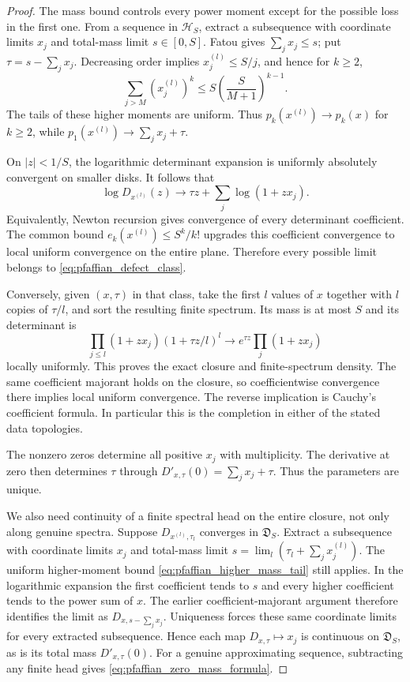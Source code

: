 \documentclass[11pt,a4paper]{amsart}
\numberwithin{equation}{section}
\theoremstyle{definition}
\theoremstyle{remark}
\begin{document}
\begin{proof}
The mass bound controls every power moment except for the possible loss in the first one. From a sequence in $\mathcal H_S$, extract a subsequence with coordinate limits $x_j$ and total-mass limit $s\in[0,S]$. Fatou gives $\sum_jx_j\le s$; put $\tau=s-\sum_jx_j$. Decreasing order implies $x_j^{(l)}\le S/j$, and hence for $k\ge2$,
\begin{equation}\label{eq:pfaffian_higher_mass_tail}
 \sum_{j>M}(x_j^{(l)})^k
 \le S\left(\frac{S}{M+1}\right)^{k-1}.
\end{equation}
The tails of these higher moments are uniform. Thus $p_k(x^{(l)})\to p_k(x)$ for $k\ge2$, while $p_1(x^{(l)})\to\sum_jx_j+\tau$.

On $|z|<1/S$, the logarithmic determinant expansion is uniformly absolutely convergent on smaller disks. It follows that
\[
 \log D_{x^{(l)}}(z)
 \longrightarrow\tau z+\sum_j\log(1+zx_j).
\]
Equivalently, Newton recursion gives convergence of every determinant coefficient. The common bound $e_k(x^{(l)})\le S^k/k!$ upgrades this coefficient convergence to local uniform convergence on the entire plane. Therefore every possible limit belongs to \eqref{eq:pfaffian_defect_class}.

Conversely, given $(x,\tau)$ in that class, take the first $l$ values of $x$ together with $l$ copies of $\tau/l$, and sort the resulting finite spectrum. Its mass is at most $S$ and its determinant is
\[
 \prod_{j\le l}(1+zx_j)(1+\tau z/l)^l
 \longrightarrow e^{\tau z}\prod_j(1+zx_j)
\]
locally uniformly. This proves the exact closure and finite-spectrum density. The same coefficient majorant holds on the closure, so coefficientwise convergence there implies local uniform convergence. The reverse implication is Cauchy's coefficient formula. In particular this is the completion in either of the stated data topologies.

The nonzero zeros determine all positive $x_j$ with multiplicity. The derivative at zero then determines $\tau$ through $D'_{x,\tau}(0)=\sum_jx_j+\tau$. Thus the parameters are unique.

We also need continuity of a finite spectral head on the entire closure, not only along genuine spectra. Suppose $D_{x^{(l)},\tau_l}$ converges in $\mathfrak D_S$. Extract a subsequence with coordinate limits $x_j$ and total-mass limit $s=\lim_l(\tau_l+\sum_jx_j^{(l)})$. The uniform higher-moment bound \eqref{eq:pfaffian_higher_mass_tail} still applies. In the logarithmic expansion the first coefficient tends to $s$ and every higher coefficient tends to the power sum of $x$. The earlier coefficient-majorant argument therefore identifies the limit as $D_{x,s-\sum_jx_j}$. Uniqueness forces these same coordinate limits for every extracted subsequence. Hence each map $D_{x,\tau}\mapsto x_j$ is continuous on $\mathfrak D_S$, as is its total mass $D'_{x,\tau}(0)$. For a genuine approximating sequence, subtracting any finite head gives \eqref{eq:pfaffian_zero_mass_formula}.


\end{proof}
\end{document}
